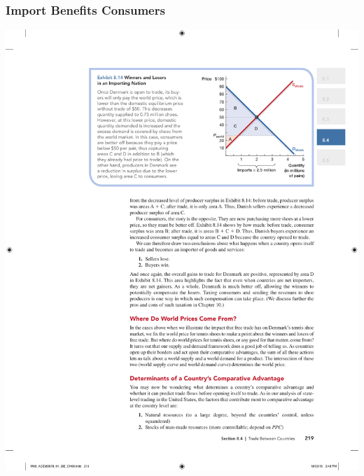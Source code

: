 \documentclass[12pt, xcolor=dvipsnames]{beamer}
\begin{document}
\begin{frame}
\frametitle{\bf Import Benefits Consumers}
\begin{center}
\includegraphics[height=.85\textheight]{figures/3.pdf}
\end{center}
\end{frame}
\end{document}
